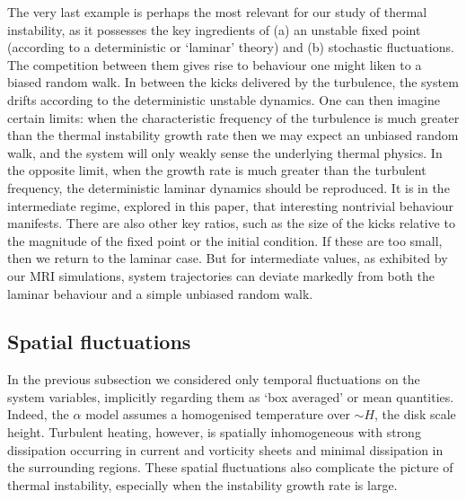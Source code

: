 \documentclass[useAMS]{mn2e}
\begin{document}
The very last example is perhaps the most relevant for our study of
thermal instability, as it possesses the key ingredients of (a) an
unstable fixed point (according to a deterministic or `laminar'
theory) and (b) stochastic fluctuations. The competition between them
gives rise to behaviour one might
liken to a biased random walk. In between the kicks delivered by the
turbulence, the system drifts according to the deterministic unstable
dynamics. One can then imagine certain limits: when the characteristic
frequency of the turbulence is much greater than the thermal
instability growth rate then we may expect an unbiased random walk,
and the system will only weakly sense the underlying thermal physics.
In the opposite limit, when the growth rate is much greater than the
turbulent frequency, the deterministic laminar
dynamics should be reproduced. It is in the intermediate regime, explored in this paper,
that interesting nontrivial behaviour manifests. There are
also other key ratios, such as the size of the kicks relative to the
magnitude of the fixed point or the initial condition. 
If these are too small, then we
return to the laminar case. But for intermediate values, as exhibited
by our MRI simulations, system trajectories can deviate markedly from
both the laminar behaviour and a simple unbiased random walk.   

\subsection{Spatial  fluctuations}

In the previous subsection we considered only temporal fluctuations on
the system variables, implicitly regarding them as `box averaged' or
mean quantities. Indeed, the $\alpha$ model assumes a homogenised
temperature over $\sim H$, the disk scale height.
Turbulent heating, however, is spatially inhomogeneous with strong
dissipation occurring in current and vorticity sheets and minimal
dissipation in the surrounding regions. 
These spatial fluctuations
also complicate the picture of thermal instability, especially when
the instability growth rate is large.
\end{document}
